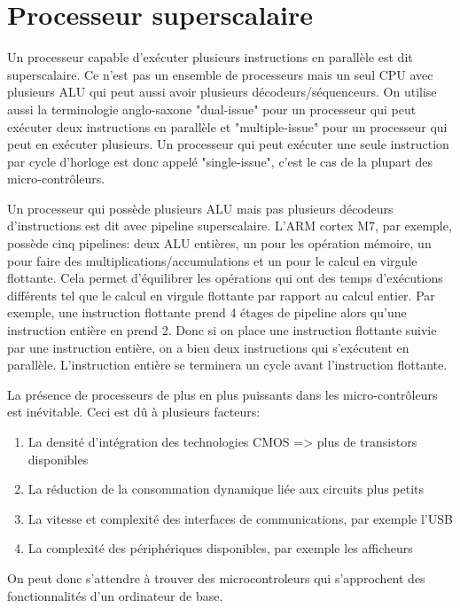 \section{Processeur superscalaire}
Un processeur capable d'exécuter plusieurs instructions en parallèle est dit superscalaire. Ce n'est pas un ensemble de processeurs mais un seul CPU avec plusieurs ALU qui peut aussi avoir plusieurs décodeurs/séquenceurs. On utilise aussi la terminologie anglo-saxone "dual-issue" pour un processeur qui peut exécuter deux instructions en parallèle et "multiple-issue" pour un processeur qui peut en exécuter plusieurs. Un processeur qui peut exécuter une seule instruction par cycle d'horloge est donc appelé "single-issue", c'est le cas de la plupart des micro-contrôleurs. 

Un processeur qui possède plusieurs ALU mais pas plusieurs décodeurs d'instructions est dit avec pipeline superscalaire. L'ARM cortex M7, par exemple, possède cinq pipelines: deux ALU entières, un pour les opération mémoire, un pour faire des multiplications/accumulations et un pour le calcul en virgule flottante. Cela permet d'équilibrer les opérations qui ont des temps d'exécutions différents tel que le calcul en virgule flottante par rapport au calcul entier. Par exemple, une instruction flottante prend 4 étages de pipeline alors qu'une instruction entière en prend 2. Donc si on place une instruction flottante suivie par une instruction entière, on a bien deux instructions qui s'exécutent en parallèle. L'instruction entière se terminera un cycle avant l'instruction flottante.

La présence de processeurs de plus en plus puissants dans les micro-contrôleurs est inévitable. Ceci est dû à plusieurs facteurs: 
\begin{enumerate}
\item La densité d'intégration des technologies CMOS => plus de transistors disponibles
\item La réduction de la consommation dynamique liée aux circuits plus petits
\item La vitesse et complexité des interfaces de communications, par exemple l'USB
\item La complexité des périphériques disponibles, par exemple les afficheurs
\end{enumerate}

On peut donc s'attendre à trouver des microcontroleurs qui s'approchent des fonctionnalités d'un ordinateur de base.


